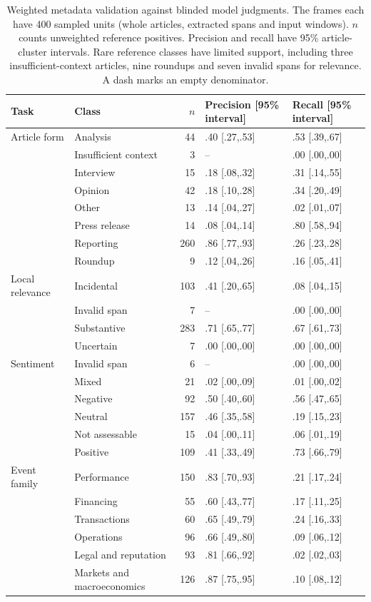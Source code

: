 \begin{table}[t]
  \centering
  \small
  \caption{Weighted metadata validation against blinded model judgments.
    The frames each have 400 sampled units (whole articles, extracted spans
    and input windows). $n$ counts unweighted reference positives. Precision
    and recall have 95\% article-cluster intervals. Rare reference classes
    have limited support, including three insufficient-context articles,
    nine roundups and seven invalid spans for relevance. A dash marks
  an empty denominator.}
  \label{tab:app-metadata}
  \begin{tabular}{llrll}
    \toprule
    Task & Class & $n$ & Precision [95\% interval] & Recall [95\% interval] \\
    \midrule
    Article form & Analysis & 44 & .40 [.27,.53] & .53 [.39,.67] \\
    & Insufficient context & 3 & -- & .00 [.00,.00] \\
    & Interview & 15 & .18 [.08,.32] & .31 [.14,.55] \\
    & Opinion & 42 & .18 [.10,.28] & .34 [.20,.49] \\
    & Other & 13 & .14 [.04,.27] & .02 [.01,.07] \\
    & Press release & 14 & .08 [.04,.14] & .80 [.58,.94] \\
    & Reporting & 260 & .86 [.77,.93] & .26 [.23,.28] \\
    & Roundup & 9 & .12 [.04,.26] & .16 [.05,.41] \\
    Local relevance & Incidental & 103 & .41 [.20,.65] & .08 [.04,.15] \\
    & Invalid span & 7 & -- & .00 [.00,.00] \\
    & Substantive & 283 & .71 [.65,.77] & .67 [.61,.73] \\
    & Uncertain & 7 & .00 [.00,.00] & .00 [.00,.00] \\
    Sentiment & Invalid span & 6 & -- & .00 [.00,.00] \\
    & Mixed & 21 & .02 [.00,.09] & .01 [.00,.02] \\
    & Negative & 92 & .50 [.40,.60] & .56 [.47,.65] \\
    & Neutral & 157 & .46 [.35,.58] & .19 [.15,.23] \\
    & Not assessable & 15 & .04 [.00,.11] & .06 [.01,.19] \\
    & Positive & 109 & .41 [.33,.49] & .73 [.66,.79] \\
    Event family & Performance & 150 & .83 [.70,.93] & .21 [.17,.24] \\
    & Financing & 55 & .60 [.43,.77] & .17 [.11,.25] \\
    & Transactions & 60 & .65 [.49,.79] & .24 [.16,.33] \\
    & Operations & 96 & .66 [.49,.80] & .09 [.06,.12] \\
    & Legal and reputation & 93 & .81 [.66,.92] & .02 [.02,.03] \\
    & Markets and macroeconomics & 126 & .87 [.75,.95] & .10 [.08,.12] \\
    \bottomrule
  \end{tabular}
\end{table}

